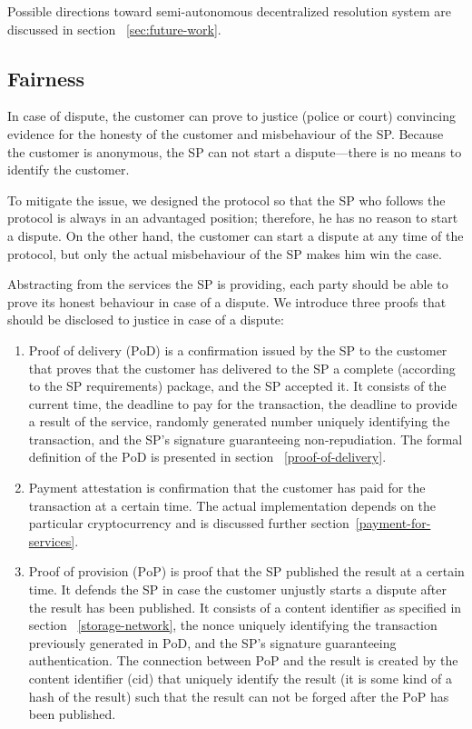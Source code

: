 \documentclass{ieeeaccess}
\begin{document}
Possible directions toward semi-autonomous decentralized resolution system are discussed in section ~\ref{sec:future-work}.

\subsection{Fairness}\label{proof-of-justice}

In case of dispute, the customer can prove to justice (police or court) convincing evidence for the honesty of the customer and misbehaviour of the SP. 
Because the customer is anonymous, the SP can not start a dispute---there is no means to identify the customer.

To mitigate the issue, we designed the protocol so that the SP who follows the protocol is always in an advantaged position; therefore, he has no reason to start a dispute. On the other hand, the customer can start a dispute at any time of the protocol, but only the actual misbehaviour of the SP makes him win the case.


Abstracting from the services the SP is providing, each party should be able to prove its honest behaviour in case of a dispute. We introduce three proofs that should be disclosed to justice in case of a dispute:

\begin{enumerate}
    \item Proof of delivery ($\mathrm{PoD}$) is a confirmation issued by the SP to the customer that proves that the customer has delivered to the SP a complete (according to the SP requirements) package, and the SP accepted it. It consists of the current time, the deadline to pay for the transaction, the deadline to provide a result of the service, randomly generated number uniquely identifying the transaction, and the SP's signature guaranteeing non-repudiation. The formal definition of the $\mathrm{PoD}$ is presented in section ~\ref{proof-of-delivery}.
    
    \item Payment $\mathrm{attestation}$ is confirmation that the customer has paid for the transaction at a certain time. The actual implementation depends on the particular cryptocurrency and is discussed further section~\ref{payment-for-services}.
    
    \item Proof of provision ($\mathrm{PoP}$) is proof that the SP published the result at a certain time. It defends the SP in case the customer unjustly starts a dispute after the result has been published. It consists of a content identifier as specified in section ~\ref{storage-network}, the $\mathrm{nonce}$ uniquely identifying the transaction previously generated in $\mathrm{PoD}$, and the SP's signature guaranteeing authentication. The connection between $\mathrm{PoP}$ and the result is created by the content identifier ($\mathrm{cid}$) that uniquely identify the result (it is some kind of a hash of the result) such that the result can not be forged after the $\mathrm{PoP}$ has been published.
\end{enumerate}
\end{document}
